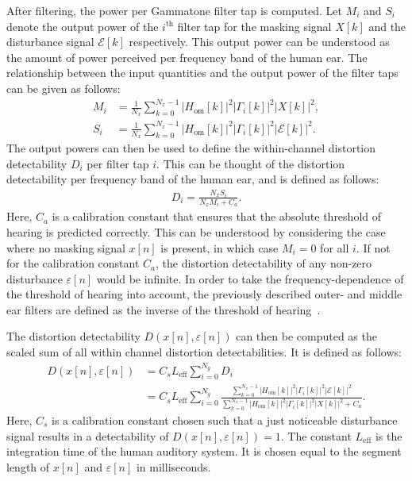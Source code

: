 After filtering, the power per Gammatone filter tap is computed.
Let $M_i$ and $S_i$ denote the output power of the $i^\text{th}$ filter tap for the masking signal $X[k]$ and 
the disturbance signal $\mathcal{E}[k]$ respectively.
This output power can be understood as the amount of power perceived per frequency band of the human ear. 
The relationship between the input quantities and the output power of the filter taps can be given as follows:
\begin{align}
    M_i &= \frac{1}{N_x}\sum_{k=0}^{N_x-1}\left|H_\text{om}[k]\right|^2\left|\Gamma_i[k]\right|^2\left|X[k]\right|^2, \\
    S_i &= \frac{1}{N_x}\sum_{k=0}^{N_x-1}\left|H_\text{om}[k]\right|^2\left|\Gamma_i[k]\right|^2\left|\mathcal{E}[k]\right|^2. 
\end{align}
The output powers can then be used to define the within-channel distortion detectability $D_i$ per filter tap $i$.
This can be thought of the distortion detectability per frequency band of the human ear, and is defined as follows:
\begin{align}
    D_i = \frac{N_xS_i}{N_xM_i + C_a}.
\end{align}
Here, $C_a$ is a calibration constant that ensures that the absolute threshold of hearing is predicted correctly.
This can be understood by considering the case where no masking signal $x[n]$ is present, 
in which case $M_i = 0$ for all $i$.
If not for the calibration constant $C_a$, the distortion detectability of any non-zero disturbance
$\varepsilon[n]$ would be infinite.
In order to take the frequency-dependence of the threshold of hearing into account, the previously described outer- and middle ear filters are defined as the
inverse of the threshold of hearing~\cite{van2005perceptual}.

The distortion detectability $D(x[n],\varepsilon[n])$ can then be computed as the scaled sum of all 
within channel distortion detectabilities.
It is defined as follows:
\begin{align}
    D(x[n],\varepsilon[n]) &= C_s L_\text{eff}\sum_{i=0}^{N_g} D_i \\
                        &= C_s L_\text{eff}\sum_{i=0}^{N_g} 
                        \frac{\sum_{k=0}^{N_x-1}\left|H_\text{om}[k]\right|^2\left|
                            \Gamma_i[k]\right|^2\left|\mathcal{E}[k]\right|^2}
                        {\sum_{k=0}^{N_x-1}\left|H_\text{om}[k]\right|^2\left|
                            \Gamma_i[k]\right|^2\left|X[k]\right|^2 + C_a}.
    \label{eq:perceptual:implementation:computation:detectability}
\end{align}
Here, $C_s$ is a calibration constant chosen such that a just noticeable disturbance signal results in a 
detectability of $D(x[n],\varepsilon[n]) = 1$. 
The constant $L_\text{eff}$ is the integration time of the human auditory system.
It is chosen equal to the segment length of $x[n]$ and $\varepsilon[n]$ in milliseconds.  

